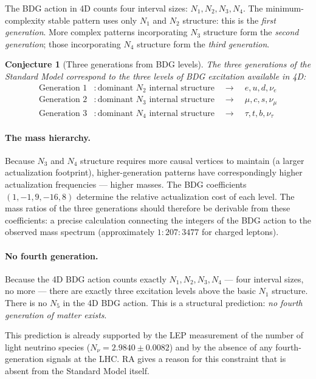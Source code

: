 \documentclass[11pt,a4paper]{article}
\newtheorem{conjecture}[theorem]{Conjecture}
\begin{document}
The BDG action in 4D counts four interval sizes: $N_1, N_2, N_3, N_4$.
The minimum-complexity stable pattern uses only $N_1$ and $N_2$ structure:
this is the \emph{first generation}. More complex patterns incorporating
$N_3$ structure form the \emph{second generation}; those incorporating $N_4$
structure form the \emph{third generation}.

\begin{conjecture}[Three generations from BDG levels]
The three generations of the Standard Model correspond to the three levels
of BDG excitation available in 4D:
\begin{align}
  \text{Generation 1} &: \text{dominant }N_2\text{ internal structure}
  \quad\to\quad e, u, d, \nu_e\\
  \text{Generation 2} &: \text{dominant }N_3\text{ internal structure}
  \quad\to\quad \mu, c, s, \nu_\mu\\
  \text{Generation 3} &: \text{dominant }N_4\text{ internal structure}
  \quad\to\quad \tau, t, b, \nu_\tau
\end{align}
\end{conjecture}

\paragraph{The mass hierarchy.}
Because $N_3$ and $N_4$ structure requires more causal vertices to maintain
(a larger actualization footprint), higher-generation patterns have
correspondingly higher actualization frequencies --- higher masses. The BDG
coefficients $(1, -1, 9, -16, 8)$ determine the relative actualization cost
of each level. The mass ratios of the three generations should therefore
be derivable from these coefficients: a precise calculation connecting the
integers of the BDG action to the observed mass spectrum
(approximately $1 : 207 : 3477$ for charged leptons).

\paragraph{No fourth generation.}
Because the 4D BDG action counts exactly $N_1, N_2, N_3, N_4$ --- four interval
sizes, no more --- there are exactly three excitation levels above the basic
$N_1$ structure. There is no $N_5$ in the 4D BDG action. This is a structural
prediction: \emph{no fourth generation of matter exists}.

This prediction is already supported by the LEP measurement of the number of
light neutrino species ($N_\nu = 2.9840 \pm 0.0082$) and by the absence of
any fourth-generation signals at the LHC. RA gives a reason for this
constraint that is absent from the Standard Model itself.
\end{document}
